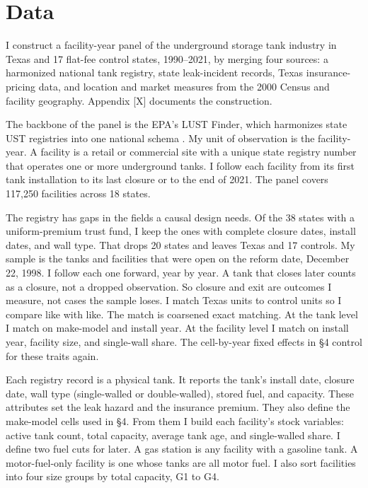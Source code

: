 \documentclass[
  12pt,
]{article}
\begin{document}
\section{Data}\label{data}

I construct a facility-year panel of the underground storage tank
industry in Texas and 17 flat-fee control states, 1990--2021, by merging
four sources: a harmonized national tank registry, state leak-incident
records, Texas insurance-pricing data, and location and market measures
from the 2000 Census and facility geography. Appendix {[}X{]} documents
the construction.

The backbone of the panel is the EPA's LUST Finder, which harmonizes
state UST registries into one national schema
\citep{EPA2017USTCompendium}. My unit of observation is the
facility-year. A facility is a retail or commercial site with a unique
state registry number that operates one or more underground tanks. I
follow each facility from its first tank installation to its last
closure or to the end of 2021. The panel covers 117,250 facilities
across 18 states.

The registry has gaps in the fields a causal design needs. Of the 38
states with a uniform-premium trust fund, I keep the ones with complete
closure dates, install dates, and wall type. That drops 20 states and
leaves Texas and 17 controls. My sample is the tanks and facilities that
were open on the reform date, December 22, 1998. I follow each one
forward, year by year. A tank that closes later counts as a closure, not
a dropped observation. So closure and exit are outcomes I measure, not
cases the sample loses. I match Texas units to control units so I
compare like with like. The match is coarsened exact matching. At the
tank level I match on make-model and install year. At the facility level
I match on install year, facility size, and single-wall share. The
cell-by-year fixed effects in §4 control for these traits again.

Each registry record is a physical tank. It reports the tank's install
date, closure date, wall type (single-walled or double-walled), stored
fuel, and capacity. These attributes set the leak hazard and the
insurance premium. They also define the make-model cells used in §4.
From them I build each facility's stock variables: active tank count,
total capacity, average tank age, and single-walled share. I define two
fuel cuts for later. A gas station is any facility with a gasoline tank.
A motor-fuel-only facility is one whose tanks are all motor fuel. I also
sort facilities into four size groups by total capacity, G1 to G4.
\end{document}
